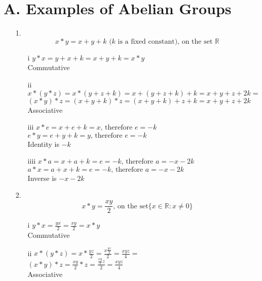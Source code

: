 \section*{A. Examples of Abelian Groups}

\begin{enumerate}

\item[1.]
\begin{equation}
x*y=x+y+k \text{ ($k$ is a fixed constant), on the set $\mathbb{R}$}
\end{equation}

\begin{enumerate}

\item[i]
$y*x=y+x+k=x+y+k=x*y$ \\
Commutative

\item[ii]
$x*(y*z)=x*(y+z+k)=x+(y+z+k)+k=x+y+z+2k=$ \\
$(x*y)*z=(x+y+k)*z=(x+y+k)+z+k=x+y+z+2k$ \\
Associative

\item[iii]
$x*e=x+e+k=x \text{, therefore } e=-k$ \\
$e*y=e+y+k=y \text{, therefore } e=-k$ \\
Identity is $-k$

\item[iiii]
$x*a=x+a+k=e=-k \text{, therefore } a=-x-2k$ \\
$a*x=a+x+k=e=-k \text{, therefore } a=-x-2k$ \\
Inverse is $-x-2k$

\end{enumerate}

\item[2.]
\begin{equation}
x*y=\frac{xy}{2} \text{, on the set} \{x \in \mathbb{R}:x \neq 0\}
\end{equation}

\begin{enumerate}

\item[i]
$y*x=\frac{yx}{2}=\frac{xy}{2}=x*y$ \\
Commutative

\item[ii]
$x*(y*z)=x*\frac{yz}{2}=\frac{x\frac{yz}{2}}{2}=\frac{xyz}{4}=$ \\
$(x*y)*z=\frac{xy}{2}*z=\frac{\frac{xy}{2}z}{2}=\frac{xyz}{4}$ \\
Associative


\end{enumerate}
\end{enumerate}
